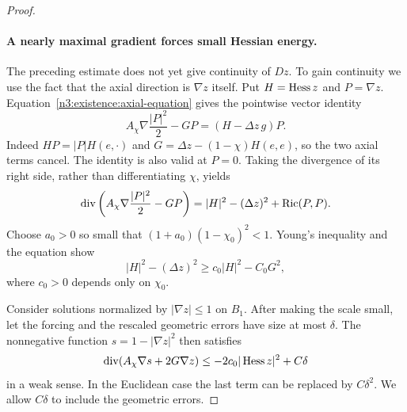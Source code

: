 \begin{proof}
\paragraph{A nearly maximal gradient forces small Hessian energy.}
The preceding estimate does not yet give continuity of $Dz$. To gain
continuity we use the fact that the axial direction is $\nabla z$
itself. Put $H=\operatorname{Hess} z$ and $P=\nabla z$.  Equation~\eqref{n3:existence:axial-equation}
gives the pointwise vector identity
\begin{equation}\label{n3:existence:gradient-flux}
 A_\chi\nabla\frac{|P|^2}{2}-GP
       =(H-\Delta z\,g)P.
\end{equation}
Indeed $HP=|P|H(e,\cdot)$ and
$G=\Delta z-(1-\chi)H(e,e)$, so the two axial terms cancel.
The identity is also valid at $P=0$.  Taking the divergence of its
right side, rather than differentiating $\chi$, yields
\begin{equation}\label{n3:existence:bochner-flux}
 \operatorname{div}\left(A_\chi\nabla\frac{|P|^2}{2}-GP\right)
 =|H|^2-(\Delta z)^2+\operatorname{Ric}(P,P).
\end{equation}
Choose $a_0>0$ so small that
$(1+a_0)(1-\chi_0)^2<1$.  Young's inequality and the equation show
\begin{equation}\label{n3:existence:positive-hessian}
 |H|^2-(\Delta z)^2
 \ge c_0|H|^2-C_0G^2,
\end{equation}
where $c_0>0$ depends only on $\chi_0$.

Consider solutions normalized by $|\nabla z|\le1$ on $B_1$.
After making the scale small, let the forcing and the rescaled
geometric errors have size at most $\delta$.  The nonnegative function
$s=1-|\nabla z|^2$ then satisfies
\begin{equation}\label{n3:existence:s-supersolution}
 \operatorname{div}(A_\chi\nabla s+2G\nabla z)
 \le -2c_0|\operatorname{Hess} z|^2+C\delta
\end{equation}
in a weak sense.  In the Euclidean case the last term can be replaced
by $C\delta^2$.  We allow $C\delta$ to include the geometric errors.


\end{proof}
